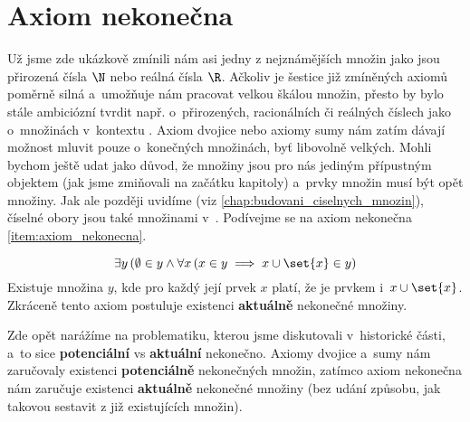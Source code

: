 \section{Axiom nekonečna}\label{sec:axiom_nekonecna}
Už jsme zde ukázkově zmínili nám asi jedny z nejznámějších množin jako jsou přirozená čísla $\N$ nebo reálná čísla $\R$. Ačkoliv je šestice již zmíněných axiomů poměrně silná a~umožňuje nám pracovat velkou škálou množin, přesto by bylo stále ambiciózní tvrdit např. o~přirozených, racionálních či reálných číslech jako o~množinách v~kontextu \ZF{}. Axiom dvojice nebo axiomy sumy nám zatím dávají možnost mluvit pouze o~konečných množinách, byť libovolně velkých. Mohli bychom ještě udat jako důvod, že množiny jsou pro nás jediným přípustným objektem (jak jsme zmiňovali na začátku kapitoly) a~prvky množin musí být opět množiny. Jak ale později uvidíme (viz \ref{chap:budovani_ciselnych_mnozin}), číselné obory jsou také množinami v~\ZF{}. Podívejme se na axiom nekonečna \ref{item:axiom_nekonecna}.
\medskip

\begin{equation*}
    \exists y\, (\emptyset\in y \land \forall x\,(x\in y\implies x\cup\set{x}\in y)
\end{equation*}
Existuje množina $y$, kde pro každý její prvek $x$ platí, že je prvkem i~$x\cup\set{x}$. Zkráceně tento axiom postuluje existenci \textbf{aktuálně} nekonečné množiny.\par
Zde opět narážíme na problematiku, kterou jsme diskutovali v~historické části, a~to sice \textbf{potenciální} vs \textbf{aktuální} nekonečno. Axiomy dvojice a~sumy nám zaručovaly existenci \textbf{potenciálně} nekonečných množin, zatímco axiom nekonečna nám zaručuje existenci \textbf{aktuálně} nekonečné množiny (bez udání způsobu, jak takovou sestavit z již existujících množin).\par